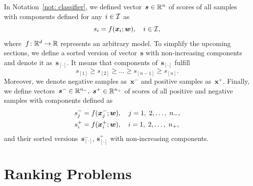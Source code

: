 \begin{notation}\label{not: scores}
  In Notation~\ref{not: classifier}, we defined vector~$\bm{s} \in \mathbb{R}^n$ of scores of all samples with components defined for any~$i \in \mathcal{I}$ as
  \begin{equation*}
    s_i = f(\bm{x}_i; \bm{w}), \quad i \in \mathcal{I},
  \end{equation*}
  where~$f \colon \mathbb{R}^d \to \mathbb{R}$ represents an arbitrary model. To simplify the upcoming sections, we define a sorted version of vector~$\bm{s}$ with non-increasing components and denote it as~$\bm{s}_{[\cdot]}.$ It means that components of~$\bm{s}_{[\cdot]}$ fulfill
  \begin{equation*}
    s_{[1]}   \geq s_{[2]} \geq \dots \geq s_{[n - 1]} \geq s_{[n]}.
  \end{equation*}
  Moreover, we denote negative samples as~$\bm{x}^-$ and positive samples as~$\bm{x}^+.$ Finally, we define vectors~$\bm{s}^- \in \mathbb{R}^{n_{-}},$ $\bm{s}^+ \in \mathbb{R}^{n_{+}}$ of scores of all positive and negative samples with components defined as
  \begin{equation*}
    \begin{aligned}
      s^-_j & = f(\bm{x}^-_j; \bm{w}), \quad j = 1, \; 2, \ldots, \; n_{-}, \\
      s^+_i & = f(\bm{x}^+_i; \bm{w}), \quad i = 1, \; 2, \ldots, \; n_{+},
    \end{aligned}
  \end{equation*}
  and their sorted versions~$\bm{s}^-_{[\cdot]}$, $\bm{s}^+_{[\cdot]}$ with non-increasing components.
\end{notation}

\section{Ranking Problems}\label{sec: ranking}

